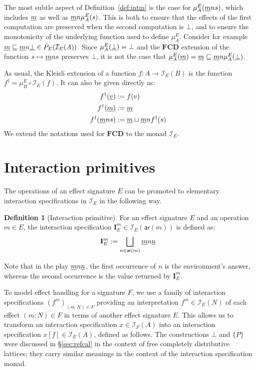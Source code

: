 \documentclass[11pt,oneside,draft]{book}
\theoremstyle{definition}
\newtheorem{definition}[theorem]{Definition}
\newcommand{\kw}[1]{\ensuremath{ \mathsf{#1} }}
\newcommand{\ul}[1]{%
  \underline{\smash{#1}}
}
\begin{document}

The most subtle aspect of Definition~\ref{def:intm}
is the case for $\mu^E_A(\ul{m} n s)$,
which includes $\ul{m}$ as well as $\ul{m} n \mu^E_A(s)$.
This is both
to ensure that the effects of the first computation are preserved
when the second computation is $\bot$, and
to ensure the monotonicity of the underlying function
used to define $\mu^E_A$.
Consider for example
$\ul{m} \sqsubseteq
 \ul{m} n \ul{\bot} \in \bar{P}_E(\mathcal{I}_E(A))$.
Since $\mu^E_A(\ul{\bot}) = \bot$ and
the $\mathbf{FCD}$ extension
of the function $s \mapsto \ul{m} n s$
preserves $\bot$,
it is not the case that
$\mu^E_A(\ul{m}) = \ul{m} \sqsubseteq
 \ul{m} n \mu^E_A(\ul{\bot})$.

As usual,
the Kleisli extension of a function $f : A \rightarrow \mathcal{I}_E(B)$
is the function $f^\dagger = \mu^E_B \circ \mathcal{I}_E(f)$.
It can also be given directly as:
\begin{align*}
  f^\dagger(\ul{v}) &:= f(v) \\
  f^\dagger(\ul{m}) &:= \ul{m} \\
  f^\dagger(\ul{m} n s) &:=
    \ul{m} \sqcup \ul{m} n f^\dagger(s)
\end{align*}
We extend the notations used for $\mathbf{FCD}$
to the monad $\mathcal{I}_E$.


\section{Interaction primitives} %

The operations of an effect signature $E$
can be promoted to elementary interaction specifications in $\mathcal{I}_E$
in the following way.

\begin{definition}[Interaction primitive]
For an effect signature $E$ and
an operation $m \in E$,
the interaction specification
$\mathbf{I}_E^m \in \mathcal{I}_E(\kw{ar}(m))$
is defined as:
\[
  \mathbf{I}_E^m :=
    \bigsqcup_{n \in \kw{ar}(m)} \ul{m} n \ul{n}
\]
\end{definition}
Note that in the play $\ul{m} n \ul{n}$,
the first occurrence of $n$ is the environment's answer,
whereas the second occurrence is the value returned by $\mathbf{I}_E^m$.

To model effect handling for a signature $F$,
we use a family of interaction specifications
$(f^m)_{(m \mathbin: N) \in F}$
providing an interpretation $f^m \in \mathcal{I}_E(N)$
of each effect $(m \mathbin: N) \in F$
in terms of another effect signature $E$.
This allows us to transform an interaction specification
$x \in \mathcal{I}_F(A)$
into an interaction specification
$x[f] \in \mathcal{I}_E(A)$,
defined as follows.
The constructions $\bot$ and $\{P\}$ were discussed in \S\ref{sec:refcal}
in the context of free completely distributive lattices;
they carry similar meanings in the context of the
interaction specification monad.
\end{document}

